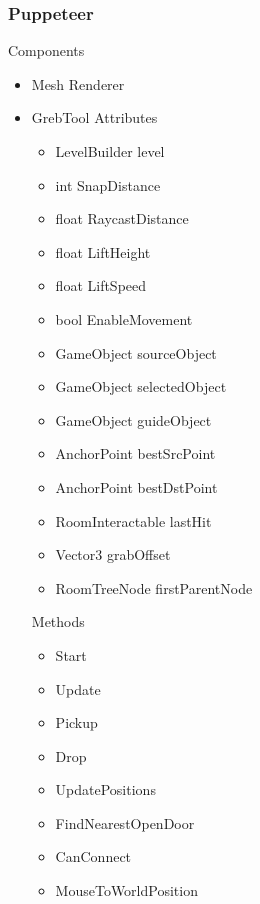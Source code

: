 \documentclass[11pt]{article}
\begin{document}
\subsubsection{Puppeteer}
Components
\begin{itemize}
\item Mesh Renderer
\item GrebTool
\newline Attributes
\begin{itemize}
\item LevelBuilder level
\item int SnapDistance
\item float RaycastDistance
\item float LiftHeight
\item float LiftSpeed
\item bool EnableMovement
\item GameObject sourceObject
\item GameObject selectedObject
\item GameObject guideObject
\item AnchorPoint bestSrcPoint
\item AnchorPoint bestDstPoint
\item RoomInteractable lastHit
\item Vector3 grabOffset
\item RoomTreeNode firstParentNode
\end{itemize}
Methods
\begin{itemize}
\item Start
\item Update
\item Pickup
\item Drop
\item UpdatePositions
\item FindNearestOpenDoor
\item CanConnect
\item MouseToWorldPosition
\end{itemize}
\end{itemize}
\end{document}
